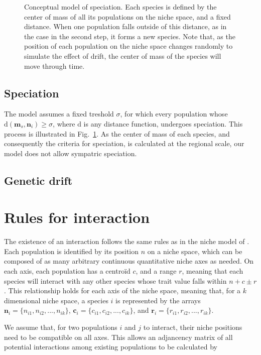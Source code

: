 \documentclass[10pt,twocolumn]{article}
\begin{document}
\begin{figure}[tb]
	\centering
	
	\caption{Conceptual model of speciation. Each species is defined by the
	center of mass of all its populations on the niche space, and a fixed
	distance. When one population falls outside of this distance, as in the
	case in the second step, it forms a new species. Note that, as the
	position of each population on the niche space changes randomly to
	simulate the effect of drift, the center of mass of the species will move
	through time.}
   \label{f:speciation}
\end{figure}

\subsection{Speciation}

The model assumes a fixed treshold $\sigma$, for which every population whose
$\mathrm{d}\left(\mathbf{m}_s,\mathbf{n}_i\right) \geq \sigma$, where
$\mathrm{d}$ is any distance function, undergoes speciation. This process is
illustrated in Fig.~\ref{f:speciation}. As the center of mass of each species,
and consequently the criteria for speciation, is calculated at the regional
scale, our model does not allow sympatric speciation.

\subsection{Genetic drift}

\section{Rules for interaction}

The existence of an interaction follows the same rules as in the niche model
of  \textcite{Williams2000}. Each population is identified by its position $n$ on
a niche space, which can be composed of as many arbitrary continuous
quantitative niche axes as needed. On each axis, each population has a centroïd
$c$, and a range $r$, meaning that each species will interact with any other
species whose trait value falls within $n+c\pm r$. This relationship holds for
each axis of the niche space, meaning that, for a $k$ dimensional niche space,
a species $i$ is represented by the arrays $\mathbf{n}_i=\{n_{i1}, n_{i2},
..., n_{ik}\}$, $\mathbf{c}_i=\{c_{i1}, c_{i2}, ..., c_{ik}\}$, and
$\mathbf{r}_i=\{r_{i1}, r_{i2}, ..., r_{ik}\}$.

We assume that, for two populations $i$ and $j$ to interact, their niche
positions need to be compatible on all axes. This allows an adjancency matrix
of all potential interactions among existing populations to be calculated by
\end{document}
